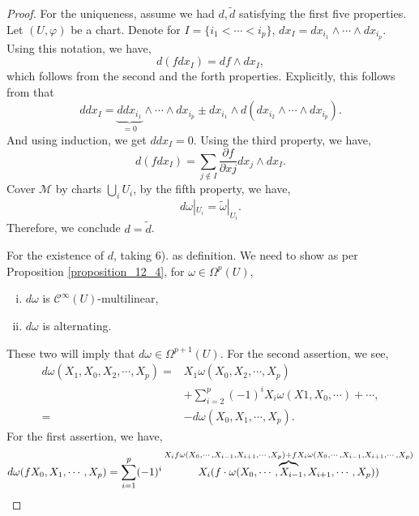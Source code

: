 \documentclass[10pt]{article}
\newcommand{\M}[0]{\mathcal{M}}
\newcommand{\cinf}[0]{\mathcal{C}^\infty}
\newcommand{\pd}[2]{{\frac {\partial #1} {\partial #2}}}
\begin{document}
\begin{proof}
  For the uniqueness, assume we had $d,\tilde{d}$ satisfying the first five properties. Let $(U,\varphi)$ be a chart. Denote for $I=\{i_1<\cdots<i_p\}$, $dx_{I} = dx_{i_1}\wedge\cdots\wedge dx_{i_p}$. 
  Using this notation, we have,
  \begin{equation*}
    d(fdx_I) = df\wedge dx_I,
  \end{equation*}
  which follows from the second and the forth properties. Explicitly, this follows from that 
  \begin{equation*}
    ddx_I = \underbrace{ddx_{i_1}}_{=0}\wedge\cdots\wedge dx_{i_p}\pm dx_{i_1}\wedge d(dx_{i_2}\wedge\cdots\wedge dx_{i_p}).
  \end{equation*}
  And using induction, we get $ddx_I=0$. Using the third property, we have,
  \begin{equation*}
    d(fdx_I) = \sum_{j\not\in I}\pd{f}{xj}dx_j\wedge dx_I.
  \end{equation*}
  Cover $\M$ by charts $\bigcup_{i}U_i$, by the fifth property, we have,
  \begin{equation*}
    d\omega|_{U_i} = \tilde{\omega}|_{U_i}.
  \end{equation*}
  Therefore, we conclude $d = \tilde{d}$.
  \par For the existence of $d$, taking 6). as definition. We need to show as per Proposition \ref{proposition_12_4}, for $\omega\in\Omega^p(U)$, 
  \begin{enumerate}[i).]
    \item $d\omega$ is $\cinf(U)$-multilinear,
    \item $d\omega$ is alternating.
  \end{enumerate}
  These two will imply that $d\omega\in\Omega^{p+1}(U)$. For the second assertion, we see,
  \begin{align*}
    d\omega(X_1,X_0,X_2,\cdots,X_p) =& X_1\omega(X_0,X_2,\cdots,X_p)\\
    &+\sum_{i=2}^p(-1)^iX_i\omega(X1,X_0,\cdots)+\cdots,\\
    =&  -d\omega(X_0,X_1,\cdots,X_p).
  \end{align*}
  For the first assertion, we have,
  \begin{align*}
    d\omega(fX_0,X_1,\cdots,X_p) & = \sum_{i=1}^p (-1)^i\overbrace{\mathmakebox[0pt][c]{X_i(f\cdot\omega(X_0,\cdots,X_{i-1},X_{i+1},\cdots,X_p))}}^{X_if\omega(X_0,\cdots,X_{i-1},X_{i+1},\cdots,X_p)+fX_i\omega(X_0,\cdots,X_{i-1},X_{i+1},\cdots,X_p)}\\

\end{align*}
\end{proof}
\end{document}
